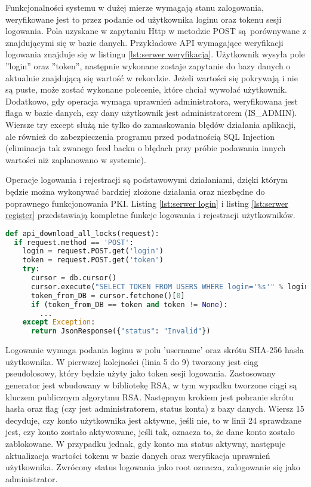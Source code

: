 \documentclass[twoside,10pt]{article}
\begin{document}
Funkcjonalności systemu w  dużej mierze wymagają stanu zalogowania, weryfikowane jest to przez podanie od użytkownika loginu oraz tokenu sesji logowania. Pola uzyskane w zapytaniu Http w metodzie POST są~porównywane z znajdującymi się w bazie danych. Przykładowe API wymagające weryfikacji logowania znajduje się w listingu \ref{lst:serwer weryfikacja}. Użytkownik wysyła pole ''login'' oraz ''token'', następnie wykonane zostaje zapytanie do bazy danych o aktualnie znajdującą się wartość w rekordzie. Jeżeli wartości się pokrywają i nie są puste, może zostać wykonane polecenie, które chciał wywołać użytkownik. Dodatkowo, gdy operacja wymaga uprawnień administratora, weryfikowana jest flaga w bazie danych, czy dany użytkownik jest administratorem (IS\_ADMIN). Wiersze try except służą nie tylko do zamaskowania błędów działania aplikacji, ale również do zabezpieczenia programu przed podatnością SQL Injection (eliminacja tak zwanego feed backu o błędach przy próbie podawania innych wartości niż zaplanowano w systemie).

Operacje logowania i rejestracji są podstawowymi działaniami, dzięki którym będzie można wykonywać bardziej złożone działania oraz niezbędne do poprawnego funkcjonowania PKI. Listing \ref{lst:serwer login} i listing \ref{lst:serwer register} przedstawiają kompletne funkcje logowania i rejestracji użytkowników. 

{\footnotesize 
\begin{lstlisting}[caption={Przykładowe API weryfikujące stan logowania}, label={lst:serwer weryfikacja}, language=Python]
def api_download_all_locks(request):
  if request.method == 'POST':
    login = request.POST.get('login')
    token = request.POST.get('token')
    try:
      cursor = db.cursor()
      cursor.execute("SELECT TOKEN FROM USERS WHERE login='%s'" % login)
      token_from_DB = cursor.fetchone()[0]
      if (token_from_DB == token and token != None):
        ...
    except Exception:
      return JsonResponse({"status": "Invalid"})
\end{lstlisting}}

Logowanie wymaga podania loginu w polu 'username' oraz skrótu SHA-256 hasła użytkownika. W pierwszej kolejności (linia 5 do 9) tworzony jest ciąg pseudolosowy, który będzie użyty jako token sesji logowania. Zastosowany generator jest wbudowany w bibliotekę RSA, w tym wypadku tworzone ciągi są kluczem publicznym algorytmu RSA. Następnym krokiem jest pobranie skrótu hasła oraz flag (czy jest administratorem, status konta) z bazy danych. Wiersz 15 decyduje, czy konto użytkownika jest aktywne, jeśli nie, to w linii 24 sprawdzane jest, czy konto zostało aktywowane, jeśli tak, oznacza to, że dane konto zostało zablokowane. W przypadku jednak, gdy konto ma status aktywny, następuje aktualizacja wartości tokenu w bazie danych oraz weryfikacja uprawnień użytkownika. Zwrócony status logowania jako root oznacza, zalogowanie się jako administrator.
\end{document}
